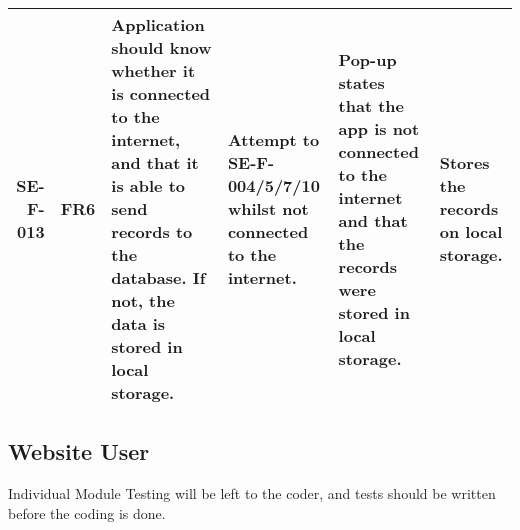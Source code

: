 \begin{landscape}
\begin{longtable}{|r|l|p{4cm}|p{4cm}|p{4cm}|p{4cm}|}
		SE-F-013 & FR6 & Application should know whether it is connected to the internet, and that it is able to send records to the database. If not, the data is stored in local storage. & Attempt to SE-F-004/5/7/10 whilst not connected to the internet. &  Pop-up states that the app is not connected to the internet and that the records were stored in local storage. & Stores the records on local storage. \\ \hline
		\end{longtable}	
	\end{landscape}

\subsection{Website User}
	Individual Module Testing will be left to the coder, and tests should be written before the coding is done.

